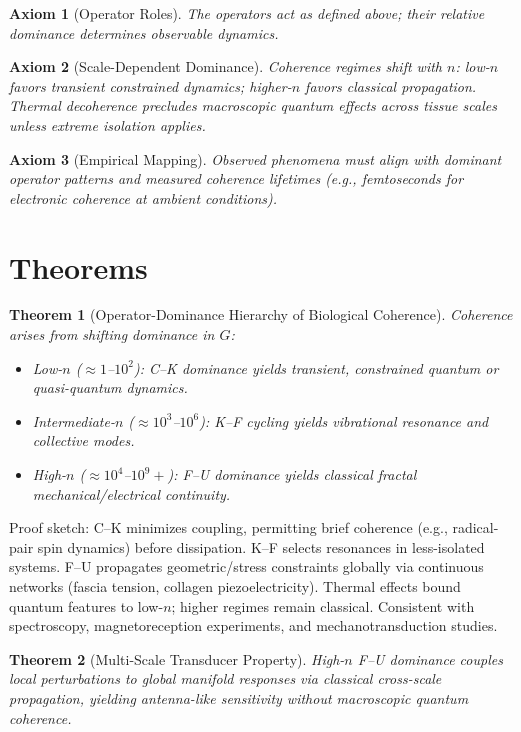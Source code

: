\documentclass{article}
\newtheorem{axiom}{Axiom}
\newtheorem{theorem}{Theorem}
\begin{document}
\begin{axiom}[Operator Roles]
The operators act as defined above; their relative dominance determines observable dynamics.
\end{axiom}

\begin{axiom}[Scale-Dependent Dominance]
Coherence regimes shift with \(n\): low-\(n\) favors transient constrained dynamics; higher-\(n\) favors classical propagation. Thermal decoherence precludes macroscopic quantum effects across tissue scales unless extreme isolation applies.
\end{axiom}

\begin{axiom}[Empirical Mapping]
Observed phenomena must align with dominant operator patterns and measured coherence lifetimes (e.g., femtoseconds for electronic coherence at ambient conditions).
\end{axiom}

\section{Theorems}

\begin{theorem}[Operator-Dominance Hierarchy of Biological Coherence]
Coherence arises from shifting dominance in \(G\):
\begin{itemize}
\item Low-\(n\) ($\approx 1$--$10^2$): C--K dominance yields transient, constrained quantum or quasi-quantum dynamics.
\item Intermediate-\(n\) ($\approx 10^3$--$10^6$): K--F cycling yields vibrational resonance and collective modes.
\item High-\(n\) ($\approx 10^4$--$10^9+$): F--U dominance yields classical fractal mechanical/electrical continuity.
\end{itemize}
\end{theorem}

Proof sketch: C--K minimizes coupling, permitting brief coherence (e.g., radical-pair spin dynamics) before dissipation. K--F selects resonances in less-isolated systems. F--U propagates geometric/stress constraints globally via continuous networks (fascia tension, collagen piezoelectricity). Thermal effects bound quantum features to low-\(n\); higher regimes remain classical. Consistent with spectroscopy, magnetoreception experiments, and mechanotransduction studies.

\begin{theorem}[Multi-Scale Transducer Property]
High-\(n\) F--U dominance couples local perturbations to global manifold responses via classical cross-scale propagation, yielding antenna-like sensitivity without macroscopic quantum coherence.
\end{theorem}
\end{document}
